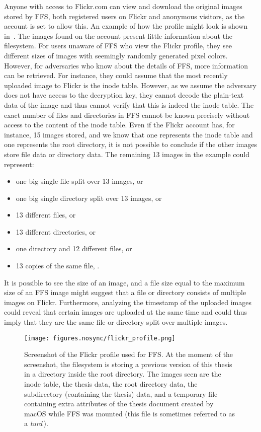 Anyone with access to Flickr.com can view and download the original images stored by \gls{FFS}, both registered users on Flickr and anonymous visitors, as the account is set to allow this. An example of how the profile might look is shown in~. The images found on the account present little information about the filesystem. For users unaware of \gls{FFS} who view the Flickr profile, they see different sizes of images with seemingly randomly generated pixel colors. However, for adversaries who know about the details of \gls{FFS}, more information can be retrieved. For instance, they could assume that the most recently uploaded image to Flickr is the inode table. However, as we assume the adversary does not have access to the decryption key, they cannot decode the \mbox{plain-text} data of the image and thus cannot verify that this is indeed the inode table. The exact number of files and directories in \gls{FFS} cannot be known precisely without access to the content of the inode table. Even if the Flickr account has, for instance, 15 images stored, and we know that one represents the inode table and one represents the root directory, it is not possible to conclude if the other images store file data or directory data. The remaining 13 images in the example could represent:
\begin{itemize}
	\item one big single file split over 13 images, or
	\item one big single directory split over 13 images, or
	\item 13 different files, or
	\item 13 different directories, or
	\item one directory and 12 different files, or
	\item 13 copies of the same file, \etc.
\end{itemize}
It is possible to see the size of an image, and a file size equal to the maximum size of an \gls{FFS} image might suggest that a file or directory consists of multiple images on Flickr. Furthermore, analyzing the timestamp of the uploaded images could reveal that certain images are uploaded at the same time and could thus imply that they are the same file or directory split over multiple images.

\begin{figure}[!ht]
	\begin{center}
	  \texttt{[image: figures.nosync/flickr\_profile.png]}
	\end{center}
	\caption[Screenshot of the Flickr profile used for \gls{FFS}]{Screenshot of the Flickr profile used for \gls{FFS}. At the moment of the screenshot, the filesystem is storing a previous version of this thesis in a directory inside the root directory. The images seen are the inode table, the thesis data, the root directory data, the subdirectory (containing the thesis) data, and a temporary file containing extra attributes of the thesis document created by macOS while \gls{FFS} was mounted (this file is sometimes referred to as a \textit{turd}\,\cite{geekosaurAnswerWhyAre2011}).}
	\label{fig:flickr_profile}
\end{figure}
\FloatBarrier

